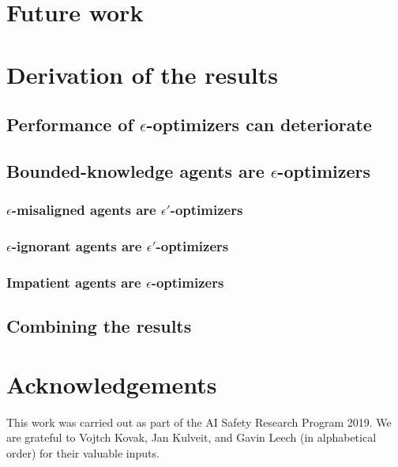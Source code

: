 \documentclass{article} %
\theoremstyle{remark}
\begin{document}
\section{Future work} \label{sec:conclusions}


\section{Derivation of the results}

\subsection{Performance of \texorpdfstring{$\epsilon$}{epsilon}-optimizers can deteriorate}
\label{sec:policy_mod_techn}


\subsection{Bounded-knowledge agents are \texorpdfstring{$\epsilon$}{epsilon}-optimizers}
\label{sec:optimization_bounds_techn}


\subsubsection{\texorpdfstring{$\epsilon$}{epsilon}-misaligned agents are \texorpdfstring{$\epsilon'$}{epsilon'}-optimizers}
\label{sec:belief_techn}


\subsubsection{\texorpdfstring{$\epsilon$}{epsilon}-ignorant agents are \texorpdfstring{$\epsilon'$}{epsilon'}-optimizers}
\label{sec:belief_techn}


\subsubsection{Impatient agents are \texorpdfstring{$\epsilon$}{epsilon}-optimizers}
\label{sec:gammas_techn}


\subsection{Combining the results}
\label{sec:combining_techn}


\section{Acknowledgements}
This work was carried out as part of the AI Safety Research Program 2019.
We are grateful to Vojtch Kovak, Jan Kulveit, and Gavin Leech (in alphabetical order) for their valuable inputs.



\end{document}
